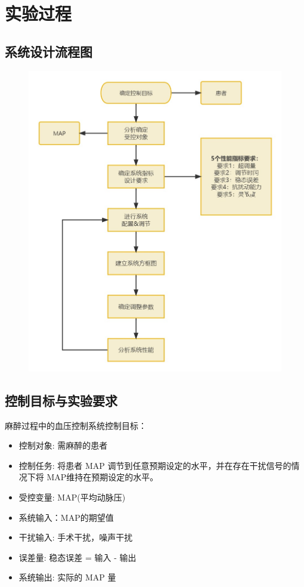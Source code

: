 \documentclass{thuemp}
\begin{document}
\section{实验过程}

\subsection{系统设计流程图}
\begin{figure}[H]
\centering
\includegraphics[width=0.8\linewidth]{./img/work_stream.jpg}
\end{figure}


\subsection{控制目标与实验要求}

麻醉过程中的血压控制系统控制目标：
\begin{itemize}
	\item 控制对象: 需麻醉的患者
	\item 控制任务: 将患者 MAP 调节到任意预期设定的水平，并在存在干扰信号的情况下将 MAP维持在预期设定的水平。
	\item 受控变量: MAP(平均动脉压)
	\item 系统输入：MAP的期望值
	\item 干扰输入: 手术干扰，噪声干扰
	\item 误差量: 稳态误差 = 输入 - 输出
	\item 系统输出: 实际的 MAP 量
\end{itemize}
\end{document}
